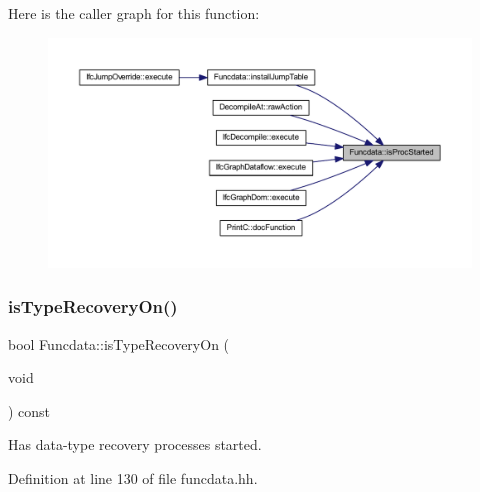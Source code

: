Here is the caller graph for this function\+:
\nopagebreak
\begin{figure}[H]
\begin{center}
\leavevmode
\includegraphics[width=350pt]{class_funcdata_aecb26084299205063c0a3d37ddfcc54f_icgraph}
\end{center}
\end{figure}
\mbox{\label{class_funcdata_ad1ddd307891ab537b02195847a5c0cd5}} 
\subsubsection{\texorpdfstring{isTypeRecoveryOn()}{isTypeRecoveryOn()}}
{\footnotesize\ttfamily bool Funcdata\+::is\+Type\+Recovery\+On (\begin{DoxyParamCaption}\item[{void}]{ }\end{DoxyParamCaption}) const\hspace{0.3cm}{\ttfamily [inline]}}



Has data-\/type recovery processes started. 



Definition at line 130 of file funcdata.\+hh.

